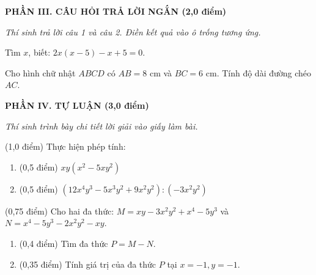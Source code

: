 \documentclass[12pt,a4paper]{article}
\begin{document}
\setcounter{ex}{0}
\noindent\textbf{\large PHẦN III. CÂU HỎI TRẢ LỜI NGẮN (2,0 điểm)}

\textit{Thí sinh trả lời câu 1 và câu 2. Điền kết quả vào ô trống tương ứng.}

\vspace{1mm}
\begin{ex}
Tìm $x$, biết: $2x(x - 5) - x + 5 = 0$. 
\end{ex}

\begin{ex}
Cho hình chữ nhật $ABCD$ có $AB = 8\text{ cm}$ và $BC = 6\text{ cm}$. Tính độ dài đường chéo $AC$. 
\end{ex}


\setcounter{ex}{0}
\noindent\textbf{\large PHẦN IV. TỰ LUẬN (3,0 điểm)}

\textit{Thí sinh trình bày chi tiết lời giải vào giấy làm bài.}

\vspace{1mm}
\begin{ex} (1,0 điểm)
Thực hiện phép tính:
\begin{enumerate}[label=\textbf{\alph*)}, leftmargin=0.8cm, itemsep=2pt]
\item (0,5 điểm) $xy(x^2 - 5xy^2)$
\item (0,5 điểm) $(12x^4y^3 - 5x^3y^2 + 9x^2y^2) : (-3x^2y^2)$
\end{enumerate}
\end{ex}
\vspace{0.5mm}

\begin{ex} (0,75 điểm)
Cho hai đa thức: $M = xy - 3x^2y^2 + x^4 - 5y^3$ và $N = x^4 - 5y^3 - 2x^2y^2 - xy$.
\begin{enumerate}[label=\textbf{\alph*)}, leftmargin=0.8cm, itemsep=2pt]
\item (0,4 điểm) Tìm đa thức $P = M - N$.
\item (0,35 điểm) Tính giá trị của đa thức $P$ tại $x = -1, y = -1$.
\end{enumerate}
\end{ex}
\vspace{0.5mm}
\end{document}
